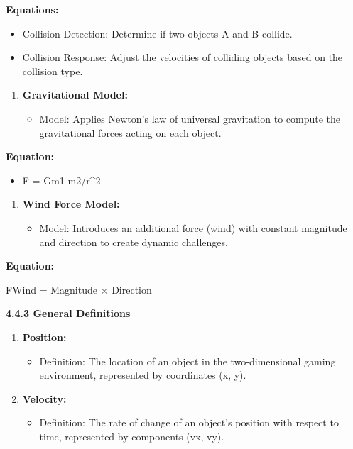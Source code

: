 \documentclass[
]{article}
\begin{document}
\textbf{Equations:}

\begin{itemize}
\item
  Collision Detection: Determine if two objects A and B collide.
\item
  Collision Response: Adjust the velocities of colliding objects based
  on the collision type.
\end{itemize}

\begin{enumerate}
\def\labelenumi{\arabic{enumi}.}
\setcounter{enumi}{2}
\item
  \textbf{Gravitational Model:}

  \begin{itemize}
  \item
    Model: Applies Newton's law of universal gravitation to compute the
    gravitational forces acting on each object.
  \end{itemize}
\end{enumerate}

\textbf{Equation:}

\begin{itemize}
\item
  F = Gm1 m2/r\^{}2
\end{itemize}

\begin{enumerate}
\def\labelenumi{\arabic{enumi}.}
\setcounter{enumi}{3}
\item
  \textbf{Wind Force Model:}

  \begin{itemize}
  \item
    Model: Introduces an additional force (wind) with constant magnitude
    and direction to create dynamic challenges.
  \end{itemize}
\end{enumerate}

\textbf{Equation:}

FWind = Magnitude × Direction

\protect\hypertarget{qrrrrrrrrrrrrrrr}{}{}\textbf{4.4.3 General
Definitions}

\begin{enumerate}
\def\labelenumi{\arabic{enumi}.}
\item
  \textbf{Position:}

  \begin{itemize}
  \item
    Definition: The location of an object in the two-dimensional gaming
    environment, represented by coordinates (x, y).
  \end{itemize}
\item
  \textbf{Velocity:}

  \begin{itemize}
  \item
    Definition: The rate of change of an object's position with respect
    to time, represented by components (vx, vy).
  \end{itemize}
\end{enumerate}
\end{document}
